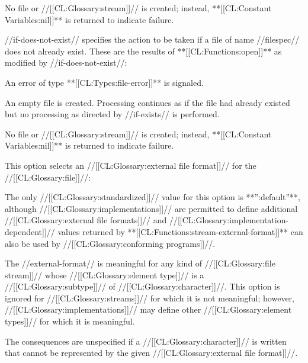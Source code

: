 
No file or //[[CL:Glossary:stream]]// is created; instead, **[[CL:Constant Variables:nil]]** is returned to indicate failure.

\endlist


//if-does-not-exist// specifies the action to be taken if a file of name //filespec// does not already exist. These are the results of **[[CL:Functions:open]]** as modified by //if-does-not-exist//:

\beginlist


An error of type **[[CL:Types:file-error]]** is signaled.


An empty file is created. Processing continues as if the file had already existed but no processing as directed by //if-exists// is performed.


No file or //[[CL:Glossary:stream]]// is created; instead, **[[CL:Constant Variables:nil]]** is returned to indicate failure.

\endlist


This option selects an //[[CL:Glossary:external file format]]// for the //[[CL:Glossary:file]]//:

The only //[[CL:Glossary:standardized]]// value for this option is **'':default''**, although //[[CL:Glossary:implementations]]// are permitted to define additional //[[CL:Glossary:external file formats]]// and //[[CL:Glossary:implementation-dependent]]// values returned by **[[CL:Functions:stream-external-format]]** can also be used by //[[CL:Glossary:conforming programs]]//.


The //external-format// is meaningful for any kind of //[[CL:Glossary:file stream]]// whose //[[CL:Glossary:element type]]// is a //[[CL:Glossary:subtype]]// of //[[CL:Glossary:character]]//. This option is ignored for //[[CL:Glossary:streams]]// for which it is not meaningful; however, //[[CL:Glossary:implementations]]// may define other //[[CL:Glossary:element types]]// for which it is meaningful.

The consequences are unspecified if a //[[CL:Glossary:character]]// is written that cannot be represented by the given //[[CL:Glossary:external file format]]//.

